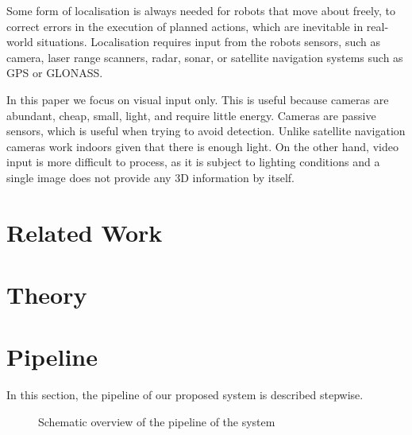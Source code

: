\documentclass[a4paper]{article}
\begin{document}
Some form of localisation is always needed for robots that move about freely,
to correct errors in the execution of planned actions, which are inevitable in
real-world situations. Localisation requires input from the robots sensors,
such as camera, laser range scanners, radar, sonar, or satellite navigation
systems such as GPS \citep{easton1978navigation} or GLONASS.

In this paper we focus on visual input only. This is useful because cameras are
abundant, cheap, small, light, and require little energy. Cameras are passive
sensors, which is useful when trying to avoid detection. Unlike satellite
navigation cameras work indoors given that there is enough light.
On the other hand, video input is more difficult to process, as it is subject
to lighting conditions and a single image does not provide any 3D information
by itself.

\section{Related Work}

\section{Theory}

\section{Pipeline}
In this section, the pipeline of our proposed system is described stepwise.

\begin{figure}[!hb]
	\centerline{
	}
	\caption{Schematic overview of the pipeline of the system}
	\label{fig:system}
\end{figure}
\end{document}
